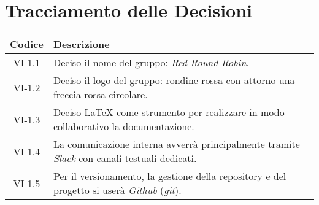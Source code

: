 \section*{Tracciamento delle Decisioni}

\begin{center}
	\begin{longtable}{|c|p{14.5cm}|}
	\hline
	\rowcolor{lighter-grayer}
	\textbf{Codice} & \textbf{Descrizione} \\
	\hline
	\endfirsthead

	\hline
	VI-1.1 & Deciso il nome del gruppo: \textit{Red Round Robin}. \\
	\hline
	VI-1.2 & Deciso il logo del gruppo: rondine rossa con attorno una freccia rossa circolare. \\
	\hline
	VI-1.3 & Deciso \LaTeX{} come strumento per realizzare in modo collaborativo la documentazione. \\
	\hline
	VI-1.4 & La comunicazione interna avverrà principalmente tramite \textit{Slack} con canali testuali dedicati. \\
	\hline
	VI-1.5 & Per il versionamento, la gestione della repository e del progetto si userà \textit{Github} (\textit{git}). \\
	\hline

	\end{longtable}
\end{center}